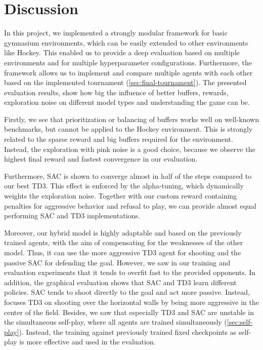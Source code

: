 \section{Discussion}
In this project, we implemented a strongly modular framework for basic gymnasium environments, which can be easily extended to other environments like Hockey. This enabled us to provide a deep evaluation based on multiple environments and for multiple hyperparameter configurations. Furthermore, the framework allows us to implement and compare multiple agents with each other based on the implemented tournament (\autoref{sec:final-tournament}). The presented evaluation results, show how big the influence of better buffers, rewards, exploration noise on different model types and understanding the game can be.

Firstly, we see that prioritization or balancing of buffers works well on well-known benchmarks, but cannot be applied to the Hockey environment. This is strongly related to the sparse reward and big buffers required for the environment. Instead, the exploration with pink noise is a good choice, because we observe the highest final reward and fastest convergence in our evaluation.

Furthermore, \ac{SAC} is shown to converge almost in half of the steps compared to our best \ac{TD3}. This effect is enforced by the alpha-tuning, which dynamically weights the exploration noise. Together with our custom reward containing penalties for aggressive behavior and refusal to play, we can provide almost equal performing \ac{SAC} and \ac{TD3} implementations.

Moreover, our hybrid model is highly adaptable and based on the previously trained agents, with the aim of compensating for the weaknesses of the other model. Thus, it can use the more aggressive \ac{TD3} agent for shooting and the passive \ac{SAC} for defending the goal. However, we saw in our training and evaluation experiments that it tends to overfit fast to the provided opponents. In addition, the graphical evaluation shows that \ac{SAC} and \ac{TD3} learn different policies. \ac{SAC} tends to shoot directly to the goal and act more passive. Instead, focuses \ac{TD3} on shooting over the horizontal walls by being more aggressive in the center of the field. Besides, we saw that especially \ac{TD3} and \ac{SAC} are unstable in the simultaneous self-play, where all agents are trained simultaneously (\autoref{sec:self-play}). Instead, the training against previously trained fixed checkpoints as self-play is more effective and used in the evaluation.

